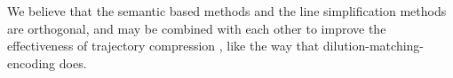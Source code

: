 {We believe that the semantic based methods and the line simplification methods are orthogonal, and may be combined with each other to improve the effectiveness of trajectory compression \cite{Lin:Cised}, like the way that dilution-matching-encoding \cite{Gotsman:Compaction} does.}



